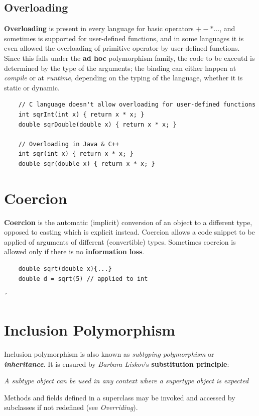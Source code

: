 \subsection{Overloading}
\textbf{Overloading} is present in every language for basic operators $+-*...$,
and sometimes is supported for user-defined functions, 
and in some languages it is even allowed the overloading of primitive operator by user-defined functions.\\
Since this falls under the \textbf{ad hoc} polymorphism family,
the code to be executd is determined by the type of the arguments;
the binding can either happen at \textit{compile} or at \textit{runtime},
depending on the typing of the language,
whether it is static or dynamic.

\begin{lstlisting}
    // C language doesn't allow overloading for user-defined functions
    int sqrInt(int x) { return x * x; }
    double sqrDouble(double x) { return x * x; }
    
    // Overloading in Java & C++
    int sqr(int x) { return x * x; }
    double sqr(double x) { return x * x; }
\end{lstlisting}


\section{Coercion}
\textbf{Coercion} is the automatic (implicit) conversion of an object to a different type, opposed to casting which is explicit instead.
Coercion allows a code snippet to be applied of arguments of different (convertible) types.
Sometimes coercion is allowed only if there is no \textbf{information loss}.

\begin{lstlisting}
    double sqrt(double x){...}
    double d = sqrt(5) // applied to int
\end{lstlisting}

´\section{Inclusion Polymorphism}
Inclusion polymorphism is also known as \textit{subtyping polymorphism} or \textit{\textbf{inheritance}}.
It is ensured by \textit{Barbara Liskov}'s \textbf{substitution principle}:
\begin{center}
    \textit{A subtype object can be used in any context where a supertype object is expected}
\end{center}
Methods and fields defined in a superclass may be invoked and accessed by subclasses if not redefined (see \textit{Overriding}).


